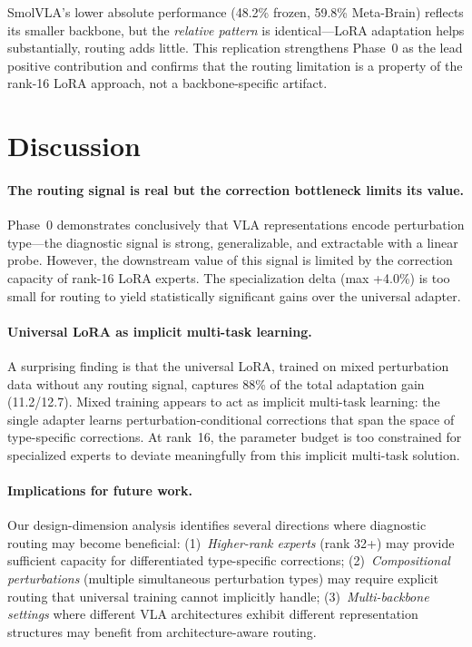 \documentclass[letterpaper]{article}
\newcommand{\ours}{Meta-Brain}
\begin{document}
SmolVLA's lower absolute performance (48.2\% frozen, 59.8\% \ours{}) reflects its smaller backbone, but the \emph{relative pattern} is identical---LoRA adaptation helps substantially, routing adds little.
This replication strengthens Phase~0 as the lead positive contribution and confirms that the routing limitation is a property of the rank-16 LoRA approach, not a backbone-specific artifact.

\section{Discussion}
\label{sec:discussion}

\paragraph{The routing signal is real but the correction bottleneck limits its value.}
Phase~0 demonstrates conclusively that VLA representations encode perturbation type---the diagnostic signal is strong, generalizable, and extractable with a linear probe.
However, the downstream value of this signal is limited by the correction capacity of rank-16 LoRA experts.
The specialization delta (max +4.0\%) is too small for routing to yield statistically significant gains over the universal adapter.

\paragraph{Universal LoRA as implicit multi-task learning.}
A surprising finding is that the universal LoRA, trained on mixed perturbation data without any routing signal, captures 88\% of the total adaptation gain (11.2/12.7).
Mixed training appears to act as implicit multi-task learning: the single adapter learns perturbation-conditional corrections that span the space of type-specific corrections.
At rank~16, the parameter budget is too constrained for specialized experts to deviate meaningfully from this implicit multi-task solution.

\paragraph{Implications for future work.}
Our design-dimension analysis identifies several directions where diagnostic routing may become beneficial:
(1)~\emph{Higher-rank experts} (rank 32+) may provide sufficient capacity for differentiated type-specific corrections;
(2)~\emph{Compositional perturbations} (multiple simultaneous perturbation types) may require explicit routing that universal training cannot implicitly handle;
(3)~\emph{Multi-backbone settings} where different VLA architectures exhibit different representation structures may benefit from architecture-aware routing.
\end{document}
